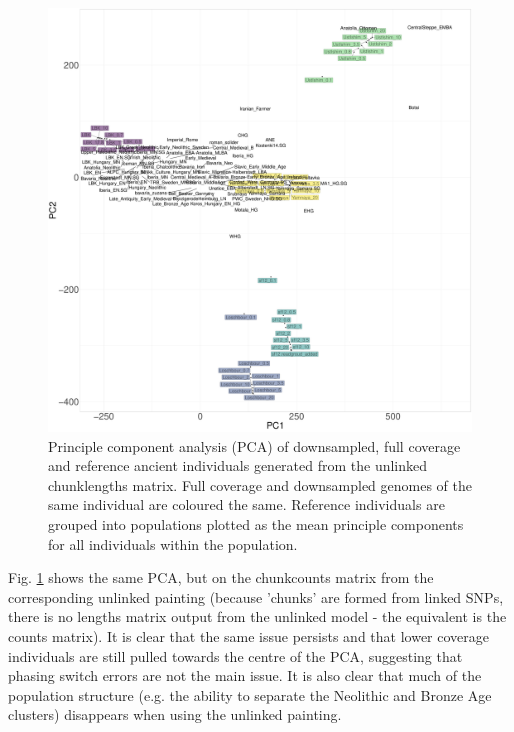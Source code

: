 \begin{figure}[htp]
    \centering
    \includegraphics[width=1.0\textwidth]{../images/chapter1/PCA_panel_allInds_unlinked.allCoverage.pdf}
    \caption{Principle component analysis (PCA) of downsampled, full coverage and reference ancient individuals generated from the unlinked chunklengths matrix. Full coverage and downsampled genomes of the same individual are coloured the same. Reference individuals are grouped into populations plotted as the mean principle components for all individuals within the population.}
    \label{fig:PCA_panel_allInds_unlinked.allCoverage}
\end{figure}

Fig. \ref{fig:PCA_panel_allInds_unlinked.allCoverage} shows the same PCA, but on the chunkcounts matrix from the corresponding unlinked painting (because 'chunks' are formed from linked SNPs, there is no lengths matrix output from the unlinked model - the equivalent is the counts matrix). It is clear that the same issue persists and that lower coverage individuals are still pulled towards the centre of the PCA, suggesting that phasing switch errors are not the main issue. It is also clear that much of the population structure (e.g. the ability to separate the Neolithic and Bronze Age clusters) disappears when using the unlinked painting. 

